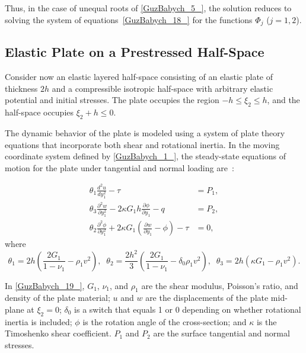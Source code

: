 Thus, in the case of unequal roots of \eqref{GuzBabych_5_}, the solution reduces to solving the system of equations~\eqref{GuzBabych_18_} for the functions $\Phi_j$ ($j=1,2$).

\subsection{Elastic Plate on a Prestressed Half-Space}
\label{GuzBabychSec3_2}

Consider now an elastic layered half-space consisting of an elastic plate of thickness $2h$ and a compressible isotropic half-space with arbitrary elastic potential and initial stresses. The plate occupies the region $-h \le \xi_2 \le h$, and the half-space occupies $\xi_2 + h \le 0$.

The dynamic behavior of the plate is modeled using a system of plate theory equations that incorporate both shear and rotational inertia. In the moving coordinate system defined by \eqref{GuzBabych_1_}, the steady-state equations of motion for the plate under tangential and normal loading are~\cite{GuzBabych10,GuzBabych1}:

\begin{equation} \label{GuzBabych_19_}
    \begin{aligned}
        \theta_1 \frac{d^2 u}{d y_1^2} - \tau &= P_1, \\
        \theta_3 \frac{\partial^2 w}{\partial y_1^2} - 2\kappa G_1 h \frac{\partial \phi}{\partial y_1} - q &= P_2, \\
        \theta_2 \frac{\partial^2 \phi}{\partial y_1^2} + 2\kappa G_1 \left( \frac{\partial w}{\partial y_1} - \phi \right) - \tau &= 0,
    \end{aligned}
\end{equation}
%
where
\[
\theta_1 = 2h\left(\frac{2G_1}{1 - \nu_1} - \rho_1 v^2\right), \;\;
\theta_2 = \frac{2h^2}{3}\left(\frac{2G_1}{1 - \nu_1} - \delta_0 \rho_1 v^2\right), \;\;
\theta_3 = 2h\left(\kappa G_1 - \rho_1 v^2\right).
\]

In \eqref{GuzBabych_19_}, $G_1$, $\nu_1$, and $\rho_1$ are the shear modulus, Poisson's ratio, and density of the plate material; $u$ and $w$ are the displacements of the plate mid-plane at $\xi_2 = 0$; $\delta_0$ is a switch that equals 1 or 0 depending on whether rotational inertia is included; $\phi$ is the rotation angle of the cross-section; and $\kappa$ is the Timoshenko shear coefficient. $P_1$ and $P_2$ are the surface tangential and normal stresses.

